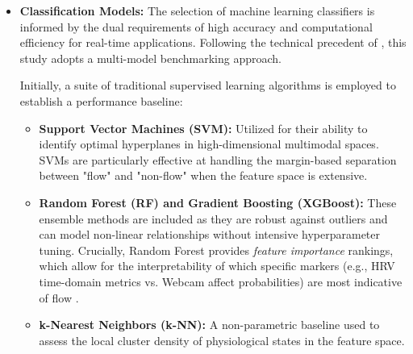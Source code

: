 \begin{itemize}
\begin{itemize}
    \item \textbf{Frequency-Domain / Temporal Features (Balance and Immersion):} For HRV, this includes Low Frequency (LF) power, High Frequency (HF) power, and the LF/HF ratio to capture the complex autonomic dual-branch co-activation patterns that characterize physiological flexibility during flow \autocite{uechtritz2026neurophysiological}. For the full multimodal benchmark, EEG power ratios (Alpha/Theta) are included to characterize the depth of cognitive immersion \autocite{katahira2018eeg}, while EDA contributes frequency-domain descriptors of arousal dynamics. In the final live evaluation, this is restricted to the ECG and Webcam temporal features (e.g., fixation durations).
    
    \item \textbf{Non-linear Features (Signal Complexity):} Measures such as Sample Entropy quantify the complexity and regularity of the signals. In flow states, physiological signals often exhibit more \enquote{efficient} regularity, whereas the chaotic patterns seen in states of high anxiety or \enquote{tilt} result in higher entropy values.
\end{itemize}

   \item \textbf{Classification Models:} The selection of machine learning classifiers is informed by the dual requirements of high accuracy and computational efficiency for real-time applications. Following the technical precedent of \textcite{9296229}, this study adopts a multi-model benchmarking approach. 

Initially, a suite of traditional supervised learning algorithms is employed to establish a performance baseline:
\begin{itemize}
    \item \textbf{Support Vector Machines (SVM):} Utilized for their ability to identify optimal hyperplanes in high-dimensional multimodal spaces. SVMs are particularly effective at handling the margin-based separation between "flow" and "non-flow" when the feature space is extensive.
    \item \textbf{Random Forest (RF) and Gradient Boosting (XGBoost):} These ensemble methods are included as they are robust against outliers and can model non-linear relationships without intensive hyperparameter tuning. Crucially, Random Forest provides \textit{feature importance} rankings, which allow for the interpretability of which specific markers (e.g., HRV time-domain metrics vs. Webcam affect probabilities) are most indicative of flow \autocite{9296229}.
    \item \textbf{k-Nearest Neighbors (k-NN):} A non-parametric baseline used to assess the local cluster density of physiological states in the feature space.
\end{itemize}


\end{itemize}
